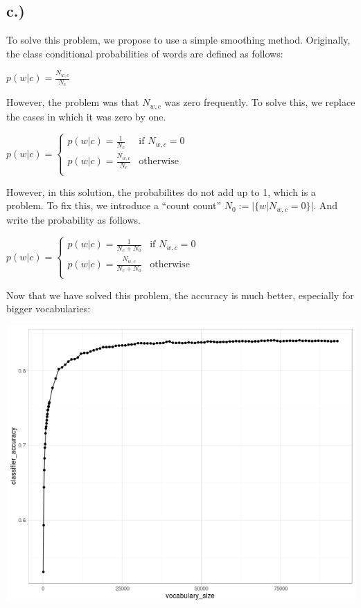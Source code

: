 \documentclass[%
   11pt,              %
   ngerman,           %
   a4paper,           %
   DIV11,             %
]{scrartcl}%
\begin{document}
\subsection*{c.)}

To solve this problem, we propose to use a simple smoothing method.
Originally, the class conditional probabilities of words are defined as follows:

$p(w|c) = \frac{N_{w,c}}{N_c}$

However, the problem was that $N_{w,c}$ was zero frequently. To solve this, we replace the cases in which it was zero by one.

$p(w|c) = \begin{cases} 
    p(w|c) = \frac{1}{N_c} & \text{if } N_{w,c} = 0\\
    p(w|c) = \frac{N_{w,c}}{N_c} & \text{otherwise}\\
\end{cases}$

However, in this solution, the probabilites do not add up to 1, which is a problem. To fix this, we introduce a ``count count'' $N_0 := |\{w|N_{w,c} = 0\}|$. And write the probability as follows.

$p(w|c) = \begin{cases} 
    p(w|c) = \frac{1}{N_c + N_0} & \text{if } N_{w,c} = 0\\
    p(w|c) = \frac{N_{w,c}}{N_c + N_0} & \text{otherwise}\\
\end{cases}$

Now that we have solved this problem, the accuracy is much better, especially for bigger vocabularies:

\includegraphics[width=\textwidth]{exercise03.1/accuracy_smoothed.png}
\end{document}
